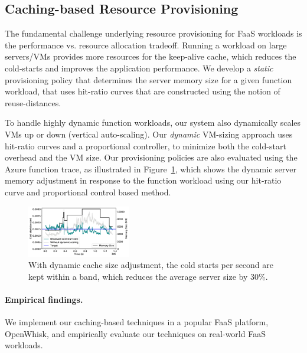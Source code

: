 \documentclass[pageno]{jpaper}
\begin{document}
\subsection{Caching-based Resource Provisioning}
\vspace*{\subsecspace}

The fundamental challenge underlying resource provisioning for FaaS workloads is the performance vs. resource allocation tradeoff. 
Running a workload on large servers/VMs provides more resources for the keep-alive cache, which reduces the cold-starts and improves the application performance.
We develop a \emph{static} provisioning policy that determines the server memory size for a given function workload, that uses hit-ratio curves that are constructed using the notion of reuse-distances. 

To handle highly dynamic function workloads, our system also dynamically scales VMs up or down (vertical auto-scaling). 
Our \emph{dynamic} VM-sizing approach uses hit-ratio curves and a proportional controller, to minimize both the cold-start overhead and the VM size.
Our provisioning policies are also evaluated using the Azure function trace, as illustrated in Figure~\ref{fig:dynamic}, which shows the dynamic server memory adjustment in response to the function workload using our hit-ratio curve and proportional control based method. 

\begin{figure}[t]
    \vspace*{\myfigspace}
  \centering 
  \includegraphics[width=0.4\textwidth]{../graphs/dyn-scale-392-b.pdf}
    \vspace*{\myfigspace}
  \caption{With dynamic cache size adjustment, the cold starts per second are kept within a band, which reduces the average server size by 30\%.}
  \label{fig:dynamic}
  \vspace*{\myfigspace}
\end{figure}



\paragraph{Empirical findings.}
 We implement our caching-based techniques in a popular FaaS platform, OpenWhisk, and empirically evaluate our techniques on real-world FaaS workloads.
\end{document}

